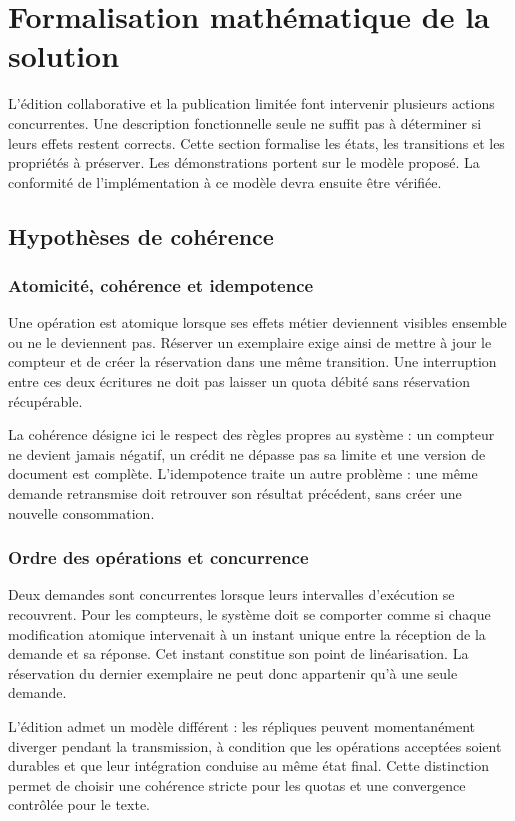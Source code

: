\section{Formalisation mathématique de la solution}
\label{sec:formalisation}

L'édition collaborative et la publication limitée font intervenir plusieurs actions concurrentes. Une description fonctionnelle seule ne suffit pas à déterminer si leurs effets restent corrects. Cette section formalise les états, les transitions et les propriétés à préserver. Les démonstrations portent sur le modèle proposé. La conformité de l'implémentation à ce modèle devra ensuite être vérifiée.

\subsection{Hypothèses de cohérence}
\subsubsection{Atomicité, cohérence et idempotence}
Une opération est atomique lorsque ses effets métier deviennent visibles ensemble ou ne le deviennent pas. Réserver un exemplaire exige ainsi de mettre à jour le compteur et de créer la réservation dans une même transition. Une interruption entre ces deux écritures ne doit pas laisser un quota débité sans réservation récupérable.

La cohérence désigne ici le respect des règles propres au système : un compteur ne devient jamais négatif, un crédit ne dépasse pas sa limite et une version de document est complète. L'idempotence traite un autre problème : une même demande retransmise doit retrouver son résultat précédent, sans créer une nouvelle consommation.

\subsubsection{Ordre des opérations et concurrence}
Deux demandes sont concurrentes lorsque leurs intervalles d'exécution se recouvrent. Pour les compteurs, le système doit se comporter comme si chaque modification atomique intervenait à un instant unique entre la réception de la demande et sa réponse. Cet instant constitue son point de linéarisation. La réservation du dernier exemplaire ne peut donc appartenir qu'à une seule demande.

L'édition admet un modèle différent : les répliques peuvent momentanément diverger pendant la transmission, à condition que les opérations acceptées soient durables et que leur intégration conduise au même état final. Cette distinction permet de choisir une cohérence stricte pour les quotas et une convergence contrôlée pour le texte.

